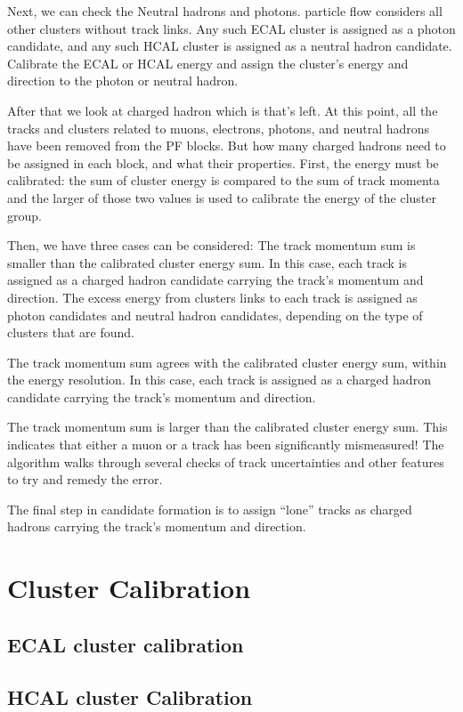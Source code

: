 Next, we can check the Neutral hadrons and photons. particle flow considers all other clusters without track links. Any such ECAL cluster is assigned as a photon candidate, and any such HCAL cluster is assigned as a neutral hadron candidate. Calibrate the ECAL or HCAL energy and assign the cluster’s energy and direction to the photon or neutral hadron. 

After that we look at charged hadron which is that’s left. At this point, all the tracks and clusters related to muons, electrons, photons, and neutral hadrons have been removed from the PF blocks.  But how many charged hadrons need to be assigned in each block, and what their properties. First, the energy must be calibrated: the sum of cluster energy is compared to the sum of track momenta and the larger of those two values is used to calibrate the energy of the cluster group.   

Then, we have three cases can be considered: The track momentum sum is smaller than the calibrated cluster energy sum. In this case, each track is assigned as a charged hadron candidate carrying the track’s momentum and direction. The excess energy from clusters links to each track is assigned as photon candidates and neutral hadron candidates, depending on the type of clusters that are found.  

The track momentum sum agrees with the calibrated cluster energy sum, within the energy resolution.  In this case, each track is assigned as a charged hadron candidate carrying the track’s momentum and direction.  

The track momentum sum is larger than the calibrated cluster energy sum. This indicates that either a muon or a track has been significantly mismeasured! The algorithm walks through several checks of track uncertainties and other features to try and remedy the error. 

The final step in candidate formation is to assign “lone” tracks as charged hadrons carrying the track’s momentum and direction. 

\section{Cluster Calibration}
\subsection{ECAL cluster calibration}
\subsection{HCAL cluster Calibration}





